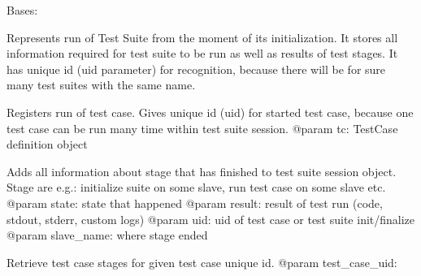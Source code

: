 \documentclass[letterpaper,10pt,english]{sphinxmanual}
\begin{document}
\begin{fulllineitems}
\label{ref-manual/XrdTest:XrdTest.TestUtils.TestSuiteSession}
Bases: {\hyperref[ref-manual/XrdTest:XrdTest.Utils.Stateful]{}}

Represents run of Test Suite from the moment of its initialization.
It stores all information required for test suite to be run as well as
results of test stages. It has unique id (uid parameter) for recognition,
because there will be for sure many test suites with the same name.

\begin{fulllineitems}
\label{ref-manual/XrdTest:XrdTest.TestUtils.TestSuiteSession.addCaseRun}
Registers run of test case. Gives unique id (uid) for started
test case, because one test case can be run many time within test
suite session.
@param tc: TestCase definition object

\end{fulllineitems}


\begin{fulllineitems}
\label{ref-manual/XrdTest:XrdTest.TestUtils.TestSuiteSession.addStageResult}
Adds all information about stage that has finished to test suite session
object. Stage are e.g.: initialize suite on some slave, run test case
on some slave etc.
@param state: state that happened
@param result: result of test run (code, stdout, stderr, custom logs)
@param uid: uid of test case or test suite init/finalize
@param slave\_name: where stage ended

\end{fulllineitems}


\begin{fulllineitems}
\label{ref-manual/XrdTest:XrdTest.TestUtils.TestSuiteSession.getTestCaseStages}
Retrieve test case stages for given test case unique id.
@param test\_case\_uid:

\end{fulllineitems}


\begin{fulllineitems}
\label{ref-manual/XrdTest:XrdTest.TestUtils.TestSuiteSession.sendEmailAlert}
\end{fulllineitems}


\end{fulllineitems}
\end{document}
